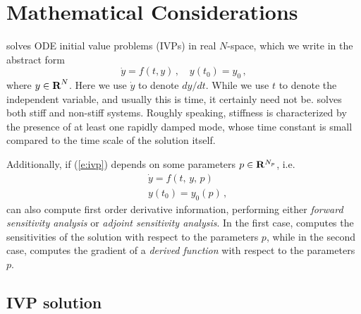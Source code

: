 \chapter{Mathematical Considerations}\label{s:math}

{\cvodes} solves ODE initial value problems (IVPs) in real $N$-space, which we
write in the abstract form
\begin{equation}\label{e:ivp} 
  {\dot y} = f(t,y) \, ,\quad y(t_0) = y_0 \, ,
\end{equation}
where $y \in \mbox{\bf R}^N$.
Here we use ${\dot y}$ to denote $dy/dt$.  While we use $t$ to denote
the independent variable, and usually this is time, it certainly need
not be.  {\cvodes} solves both stiff and non-stiff systems.  Roughly
speaking, stiffness is characterized by the presence of at least one
rapidly damped mode, whose time constant is small compared to the time
scale of the solution itself.

Additionally, if (\ref{e:ivp}) depends on some parameters $p \in {\bf R}^{N_p}$,
i.e.
\begin{equation}\label{e:ivp_p}
\begin{split}
&{\dot y}  = f(t,\,y,\,p) \\
&y(t_0)  = y_0(p) \, ,
\end{split}
\end{equation}
{\cvodes} can also compute first order derivative information, performing either
{\em forward sensitivity analysis} or {\em adjoint sensitivity analysis}.
In the first case, {\cvodes} computes the sensitivities of the
solution with respect to the parameters $p$, while in the second case,
{\cvodes} computes the gradient of a {\em derived function} with
respect to the parameters $p$.

\section{IVP solution}\label{ss:ivp_sol}

